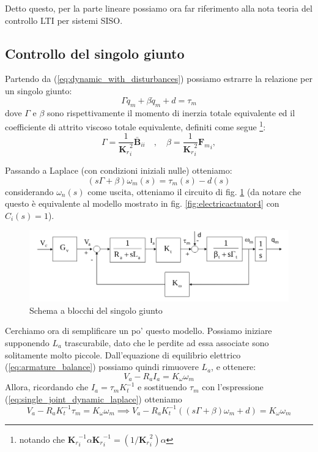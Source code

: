 Detto questo, per la parte lineare possiamo ora far riferimento alla nota teoria del controllo LTI per sistemi SISO.



\subsection{Controllo del singolo giunto}

Partendo da (\ref{eq:dynamic_with_disturbances}) possiamo estrarre la relazione per un singolo giunto:
\begin{equation}\label{eq:single_joint_dynamic}
\Gamma \ddot{q}_m + \beta \dot{q}_m + d = \tau_m
\end{equation}
dove $\Gamma$ e $\beta$ sono rispettivamente il momento di inerzia totale equivalente ed il coefficiente di attrito viscoso totale equivalente, definiti come segue 
\footnote{notando che ${\mathbf{K}_r}_i^{-1} \alpha {\mathbf{K}_r}_i^{-1} = (1/{\mathbf{K}_r}_i^2) \alpha $}:
$$
\Gamma = \frac{1}{{\mathbf{K}_r}_i^2} \mathbf{\bar{B}}_{ii} 
\quad , \quad
\beta = \frac{1}{{\mathbf{K}_r}_i^2} {\mathbf{F}_m}_i, 
$$

Passando a Laplace (con condizioni iniziali nulle) otteniamo:
\begin{equation}\label{eq:single_joint_dynamic_laplace}
(s\Gamma + \beta) \omega_m(s) = \tau_m(s) - d(s)
\end{equation}
considerando $\omega_n(s)$ come uscita, otteniamo il circuito di fig. \ref{fig:decentralizedjointspacecontrol3} (da notare che questo è equivalente al modello mostrato in fig. \ref{fig:electricactuator4} con $C_i(s) = 1$).

\begin{figure}[th!]
	\centering
	\includegraphics[width=0.7\linewidth]{images/decentralized_joint_space_control_3}
	\caption{Schema a blocchi del singolo giunto}
	\label{fig:decentralizedjointspacecontrol3}
\end{figure}


Cerchiamo ora di semplificare un po' questo modello. Possiamo iniziare supponendo $L_a$ trascurabile, dato che le perdite ad essa associate sono solitamente molto piccole.
Dall'equazione di equilibrio elettrico (\ref{eq:armature_balance}) possiamo quindi rimuovere $L_a$, e ottenere:
$$
V_a - R_aI_a = K_\omega \omega_m
$$
Allora, ricordando che $I_a = \tau_m K_t^{-1}$ e sostituendo $\tau_m$ con l'espressione (\ref{eq:single_joint_dynamic_laplace}) otteniamo 
$$
V_a - R_a K_t^{-1} \tau_m = K_\omega \omega_m
\implies
V_a - R_a K_t^{-1} ((s\Gamma + \beta)\omega_m + d)
= K_\omega \omega_m
$$



